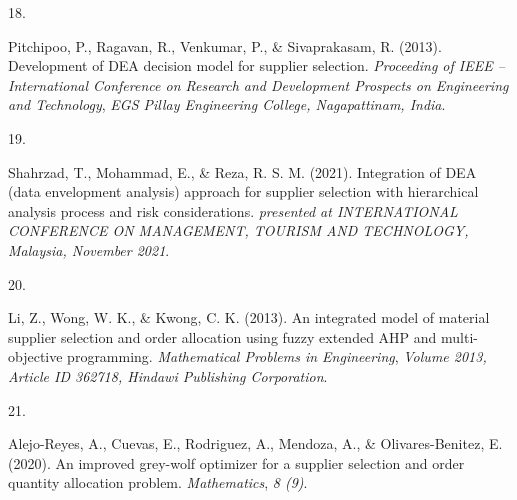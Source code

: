 \documentclass[preprint, 3p,
authoryear]{elsarticle} %
\newlength{\cslhangindent}
\newlength{\csllabelwidth}
\newlength{\cslentryspacingunit} %
\newenvironment{CSLReferences}[2] %
 {%
  \setlength{\parindent}{0pt}
  \ifodd #1
  \let\oldpar\par
  \def\par{\hangindent=\cslhangindent\oldpar}
  \fi
  \setlength{\parskip}{#2\cslentryspacingunit}
 }%
 {}
\newcommand{\CSLLeftMargin}[1]{\parbox[t]{\csllabelwidth}{#1}}
\newcommand{\CSLRightInline}[1]{\parbox[t]{\linewidth - \csllabelwidth}{#1}\break}
\begin{document}
\begin{CSLReferences}{0}{0}
\leavevmode{}%
\CSLLeftMargin{18. }%
\CSLRightInline{Pitchipoo, P., Ragavan, R., Venkumar, P., \&
Sivaprakasam, R. (2013). Development of DEA decision model for supplier
selection. \emph{Proceeding of IEEE -- International Conference on
Research and Development Prospects on Engineering and Technology},
\emph{EGS Pillay Engineering College, Nagapattinam, India}.}

\leavevmode{}%
\CSLLeftMargin{19. }%
\CSLRightInline{Shahrzad, T., Mohammad, E., \& Reza, R. S. M. (2021).
Integration of DEA (data envelopment analysis) approach for supplier
selection with hierarchical analysis process and risk considerations.
\emph{presented at INTERNATIONAL CONFERENCE ON MANAGEMENT, TOURISM AND
TECHNOLOGY, Malaysia, November 2021}.}

\leavevmode{}%
\CSLLeftMargin{20. }%
\CSLRightInline{Li, Z., Wong, W. K., \& Kwong, C. K. (2013). An
integrated model of material supplier selection and order allocation
using fuzzy extended AHP and multi-objective programming.
\emph{Mathematical Problems in Engineering}, \emph{Volume 2013, Article
ID 362718, Hindawi Publishing Corporation}.}

\leavevmode{}%
\CSLLeftMargin{21. }%
\CSLRightInline{Alejo-Reyes, A., Cuevas, E., Rodriguez, A., Mendoza, A.,
\& Olivares-Benitez, E. (2020). An improved grey-wolf optimizer for a
supplier selection and order quantity allocation problem.
\emph{Mathematics}, \emph{8 (9)}.}

\end{CSLReferences}
\end{document}
